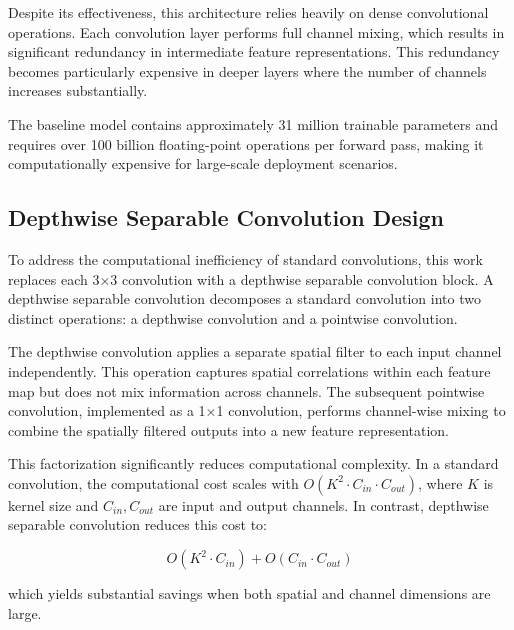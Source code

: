 \documentclass[conference]{IEEEtran}
\begin{document}
Despite its effectiveness, this architecture relies heavily on dense convolutional operations. Each convolution layer performs full channel mixing, which results in significant redundancy in intermediate feature representations. This redundancy becomes particularly expensive in deeper layers where the number of channels increases substantially.


The baseline model contains approximately 31 million trainable parameters and requires over 100 billion floating-point operations per forward pass, making it computationally expensive for large-scale deployment scenarios.

\subsection{\textbf{Depthwise Separable Convolution Design}}

To address the computational inefficiency of standard convolutions, this work replaces each 3×3 convolution with a depthwise separable convolution block. A depthwise separable convolution decomposes a standard convolution into two distinct operations: a depthwise convolution and a pointwise convolution.

The depthwise convolution applies a separate spatial filter to each input channel independently. This operation captures spatial correlations within each feature map but does not mix information across channels. The subsequent pointwise convolution, implemented as a 1×1 convolution, performs channel-wise mixing to combine the spatially filtered outputs into a new feature representation.

This factorization significantly reduces computational complexity. In a standard convolution, the computational cost scales with \( O(K^2 \cdot C_{in} \cdot C_{out}) \), where \( K \) is kernel size and \( C_{in}, C_{out} \) are input and output channels. In contrast, depthwise separable convolution reduces this cost to:

\[
O(K^2 \cdot C_{in}) + O(C_{in} \cdot C_{out})
\]

which yields substantial savings when both spatial and channel dimensions are large.



\end{document}
